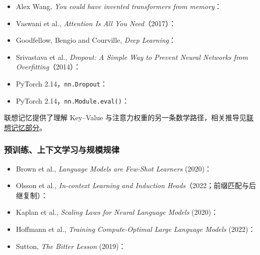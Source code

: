 \begin{itemize}
\item {}\label{source:alex-wang}Alex Wang, \emph{You could have invented transformers from memory}：
\item Vaswani et al., \emph{Attention Is All You Need}（2017）：
\item Goodfellow, Bengio and Courville, \emph{Deep Learning}：
\item {}\label{source:dropout}Srivastava et al.,
\emph{Dropout: A Simple Way to Prevent Neural Networks from Overfitting}（2014）：
\item {}\label{source:pytorch-dropout}PyTorch 2.14，\texttt{nn.Dropout}：
\item PyTorch 2.14，\texttt{nn.Module.eval()}：
\end{itemize}

联想记忆提供了理解 Key--Value 与注意力权重的另一条数学路径，相关推导见\hyperref[intro:04-key-value-outer-product]{联想记忆部分}。

\subsubsection*{预训练、上下文学习与规模规律}
\begin{itemize}
\item Brown et al., \emph{Language Models are Few-Shot Learners} (2020)：
\item Olsson et al., \emph{In-context Learning and Induction Heads}（2022；前缀匹配与后继复制）：
\item Kaplan et al., \emph{Scaling Laws for Neural Language Models} (2020)：
\item Hoffmann et al., \emph{Training Compute-Optimal Large Language Models} (2022)：
\item Sutton, \emph{The Bitter Lesson} (2019)：
\end{itemize}

